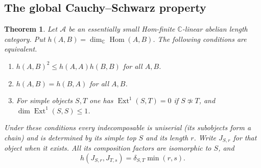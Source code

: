 \documentclass[11pt,reqno]{amsart}
\newtheorem{theorem}{Theorem}[section]
\theoremstyle{definition}
\newcommand{\Hom}{\operatorname{Hom}}
\newcommand{\Ext}{\operatorname{Ext}}
\newcommand{\CC}{\mathbb C}
\begin{document}
\subsection{The global Cauchy--Schwarz property}

\begin{theorem}\label{thm:ext}
Let $\mathcal A$ be an essentially small Hom-finite $\CC$-linear abelian
length category. Put $h(A,B)=\dim_{\CC}\Hom(A,B)$.
The following conditions are equivalent.
\begin{enumerate}
\item $h(A,B)^2\le h(A,A)h(B,B)$ for all $A,B$.
\item $h(A,B)=h(B,A)$ for all $A,B$.
\item For simple objects $S,T$ one has $\Ext^1(S,T)=0$ if
$S\not\simeq T$, and $\dim\Ext^1(S,S)\le1$.
\end{enumerate}
Under these conditions every indecomposable is uniserial (its subobjects form a chain) and is determined
by its simple top $S$ and its length $r$. Write $J_{S,r}$ for that object when it
exists. All its composition factors are isomorphic to $S$, and
\begin{equation}\label{eq:min}
   h(J_{S,r},J_{T,s})=\delta_{S,T}\min(r,s).
\end{equation}
\end{theorem}
\end{document}
